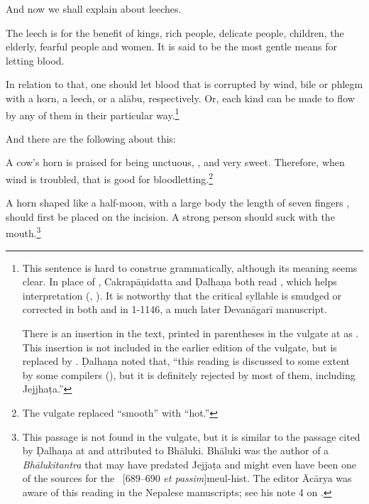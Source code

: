 \begin{translation}    
\item [1] 
    And now we shall explain  about leeches.
    
\item [2]The leech is for the benefit of kings, rich people, 
delicate people,
children, the elderly, fearful people and women.  It is said to be the most
gentle means for letting blood. 

\item [3]

In relation to that, one should let blood that is corrupted by wind, bile or
phlegm with a horn, a leech, or a \gls{alābu}, respectively.   Or, each kind
can be made to flow by any of them in their particular way.\footnote{This
    sentence is hard to construe grammatically, although its meaning seems
    clear. In place of , Cakrapāṇidatta and Ḍalhaṇa both read
    , which helps interpretation (\cite[95]{acar-1939},
    \cite[55]{vulgate}). It is notworthy that the critical syllable  is
    smudged or corrected in both  and in 1-1146, a
    much later Devanāgarī manuscript.
      
There is an insertion in the text, printed in parentheses in the
vulgate at  as  .  This insertion is not included in the
earlier edition of the vulgate, but is replaced by
 \citep[54]{susr-trikamji2}. Ḍalhaṇa noted that,
“this reading is discussed to some extent by some compilers
(), but it is definitely rejected by most of them,
including Jejjhaṭa.” }



\item [4]
And there are the following about this:

\begin{sloka}
    A cow's horn is praised for being unctuous, , and very
sweet.  Therefore, when wind is troubled, that is good for
bloodletting.\footnote{The vulgate replaced “smooth” with “hot.”}
\end{sloka}

\item [5]

\begin{sloka}
    A horn shaped like a half-moon,
    with a large body the length of seven fingers , should first be placed on the 
    incision.  A strong person should 
    suck with
the mouth.\footnote{This passage is not found in the vulgate, but it is
    similar to the passage cited by Ḍalhaṇa at  and attributed to
    Bhāluki.  Bhāluki was the author of a \emph{Bhālukitantra} that may have
    predated Jejjaṭa and might even have been one of the sources for the \SS\
    [689--690 \emph{et passim}]{meul-hist}. The editor Ācārya was
    aware of this reading in the Nepalese manuscripts; see his note 4 on
    \Su{1.13.5}{55, note 4}.}
\end{sloka}


\end{translation}
